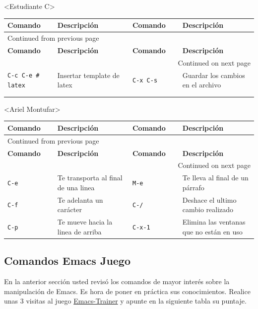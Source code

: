 \documentclass{article}
\begin{document}
<Estudiante C>
\begin{longtable}{|p{0.2\linewidth}|p{0.3\linewidth}|p{0.2\linewidth}|p{0.3\linewidth}|}
\textbf{Comando} & \textbf{Descripción} & \textbf{Comando} & \textbf{Descripción}\\[0pt]
\hline
\endfirsthead
\multicolumn{4}{l}{Continued from previous page} \\[0pt]
\hline

\textbf{Comando} & \textbf{Descripción} & \textbf{Comando} & \textbf{Descripción} \\[0pt]

\hline
\endhead
\hline\multicolumn{4}{r}{Continued on next page} \\
\endfoot
\endlastfoot
\hline
\texttt{C-c C-e \# latex} & Insertar template de  latex & \texttt{C-x C-s} & Guardar los cambios en el archivo\\[0pt]
 &  &  & \\[0pt]
 &  &  & \\[0pt]
\end{longtable}

<Ariel Montufar>
\begin{longtable}{|p{0.2\linewidth}|p{0.3\linewidth}|p{0.2\linewidth}|p{0.3\linewidth}|}
\textbf{Comando} & \textbf{Descripción} & \textbf{Comando} & \textbf{Descripción}\\[0pt]
\hline
\endfirsthead
\multicolumn{4}{l}{Continued from previous page} \\[0pt]
\hline

\textbf{Comando} & \textbf{Descripción} & \textbf{Comando} & \textbf{Descripción} \\[0pt]

\hline
\endhead
\hline\multicolumn{4}{r}{Continued on next page} \\
\endfoot
\endlastfoot
\hline
\texttt{C-e} & Te transporta al final de una linea & \texttt{M-e} & Te lleva al final de un párrafo\\[0pt]
\texttt{C-f} & Te adelanta un carácter & \texttt{C-/} & Deshace el ultimo cambio realizado\\[0pt]
\texttt{C-p} & Te mueve hacia la linea de arriba & \texttt{C-x-1} & Elimina las ventanas que no están en uso\\[0pt]
\end{longtable}
\subsection{Comandos Emacs Juego}
\label{sec:org3de1a74}
En la anterior sección usted revisó los comandos de mayor interés
sobre la manipulación de Emacs. Es hora de poner en práctica sus
conocimientos. Realice unas 3 visitas al juego  \href{https://chat.qwen.ai/s/deploy/t\_23ff57ef-b59a-4bd7-9b79-54679b33686d}{Emacs-Trainer} y apunte
en la siguiente tabla su puntaje.
\end{document}
